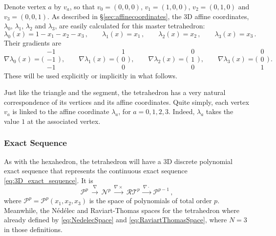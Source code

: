 Denote vertex $a$ by $v_a$, so that $v_0=(0,0,0)$, $v_1=(1,0,0)$, $v_2=(0,1,0)$ and $v_3=(0,0,1)$.
As described in \S\ref{sec:affinecoordinates}, the 3D affine coordinates, $\lambda_0$, $\lambda_1$, $\lambda_2$ and $\lambda_3$, are easily calculated for this master tetrahedron:
\begin{equation}
	\lambda_0(x)=1-x_1-x_2-x_3\,,\qquad
	\lambda_1(x)=x_1\,,\qquad
	\lambda_2(x)=x_2\,,\qquad
	\lambda_3(x)=x_3\,.
\end{equation}
Their gradients are
\begin{equation}
	\nabla\lambda_0(x)=\bigg(\begin{smallmatrix}-1\\[2pt]-1\\[2pt]-1\end{smallmatrix}\bigg)\,,\qquad
	\nabla\lambda_1(x)=\bigg(\begin{smallmatrix}1\\[2pt]0\\[2pt]0\end{smallmatrix}\bigg)\,,\qquad
	\nabla\lambda_2(x)=\bigg(\begin{smallmatrix}0\\[2pt]1\\[2pt]0\end{smallmatrix}\bigg)\,,\qquad
	\nabla\lambda_3(x)=\bigg(\begin{smallmatrix}0\\[2pt]0\\[2pt]1\end{smallmatrix}\bigg)\,.
\end{equation}
These will be used explicitly or implicitly in what follows.

Just like the triangle and the segment, the tetrahedron has a very natural correspondence of its vertices and its affine coordinates.
Quite simply, each vertex $v_a$ is linked to the affine coordinate $\lambda_a$, for $a=0,1,2,3$.
Indeed, $\lambda_a$ takes the value $1$ at the associated vertex.

\subsubsection*{Exact Sequence}

As with the hexahedron, the tetrahedron will have a 3D discrete polynomial exact sequence that represents the continuous exact sequence \eqref{eq:3D_exact_sequence}. 
It is
\begin{equation}
\mathcal{P}^p\,\xrightarrow{\nabla}\,{\mathcal{N}}^p\,\xrightarrow{\nabla\times}\,{\mathcal{RT}}^p\,\xrightarrow{\nabla\cdot}
	\,\mathcal{P}^{p-1} \, ,
\end{equation}
where $\mathcal{P}^p =\mathcal{P}^p(x_1,x_2,x_3)$ is the space of polynomials of total order $p$.
Meanwhile, the N\'{e}d\'{e}lec and Raviart-Thomas spaces for the tetrahedron where already defined by \eqref{eq:NedelecSpace} and \eqref{eq:RaviartThomasSpace}, where $N=3$ in those definitions.

